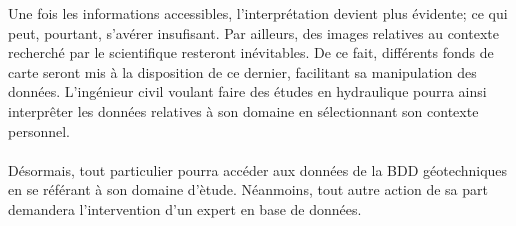 \par
Une fois les informations accessibles, l'interprétation devient 
plus évidente; ce qui peut, pourtant, s'avérer insufisant. Par 
ailleurs, des images relatives au contexte recherché par le scientifique 
resteront inévitables. De ce fait, différents fonds de carte seront mis 
à la disposition de ce dernier, facilitant sa manipulation des données. 
L'ingénieur civil voulant faire des études en hydraulique pourra ainsi 
interprêter les données relatives à son domaine en sélectionnant son 
contexte personnel.
\paragraph{}
Désormais, tout particulier pourra accéder aux données de la BDD 
géotechniques en se référant à son domaine d'ètude. Néanmoins, tout 
autre action de sa part demandera l'intervention d'un expert en base 
de données.